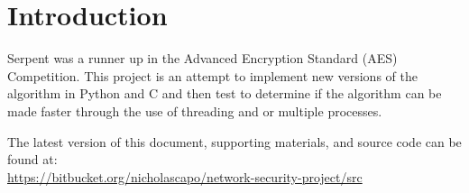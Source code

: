 \section{Introduction}

Serpent was a runner up in the Advanced Encryption Standard (AES) Competition. This project is an attempt to implement new versions of the algorithm in Python and C and then test to determine if the algorithm can be made faster through the use of threading and or multiple processes.

The latest version of this document, supporting materials, and source code can be found at:\\ \url{https://bitbucket.org/nicholascapo/network-security-project/src}
